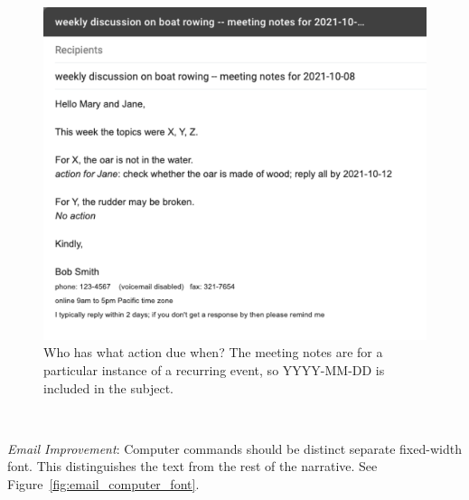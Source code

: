 \begin{figure}%
\includegraphics[width=1\textwidth]{images/email_meeting_notes.pdf}
\caption{Who has what action due when? The meeting notes are for a particular instance of a recurring event, so YYYY-MM-DD is included in the subject.}
\label{fig:email_meeting_notes}
\end{figure}

\ \\
\begin{samepage}
\textit{Email Improvement}: Computer commands should be distinct separate fixed-width font. This distinguishes the text from the rest of the narrative.  See Figure~\ref{fig:email_computer_font}.
\end{samepage}



